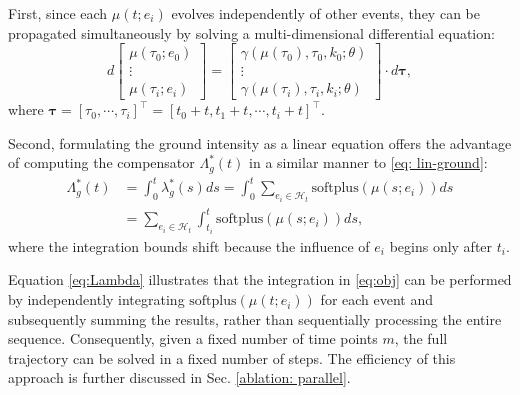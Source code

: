 First, since each $\mu(t; e_i)$ evolves independently of other events, they can be propagated simultaneously by solving a multi-dimensional differential equation:
\begin{equation}
    d 
    \begin{bmatrix}
        \mu(\tau_0 ;e_0) \\ \vdots \\ \mu(\tau_i;e_i)
    \end{bmatrix}
    = 
    \begin{bmatrix}
        \gamma(\mu(\tau_0), \tau_0, k_0;\theta) \\ \vdots \\ \gamma(\mu(\tau_i), \tau_i, k_i; \theta)
    \end{bmatrix}
    \cdot d \boldsymbol{\tau},
    \label{eq: train_parallel}
\end{equation}
where $ \boldsymbol{\tau} =[\tau_0, \cdots, \tau_i]^\top = [t_0 + t, t_1 + t, \cdots, t_i + t]^\top$. 

Second, formulating the ground intensity as a linear equation offers the advantage of computing the compensator $\Lambda^*_g(t)$ in a similar manner to \eqref{eq: lin-ground}:
\begin{align}
    \Lambda^*_g(t) & = \int_0^t \lambda_g^*(s) ds = \int_0^t \sum_{e_i \in \mathcal{H}_{t}} \text{softplus}(\mu(s; e_i)) ds \\    
    & = \sum_{e_i \in \mathcal{H}_{t}} \int_{t_i}^t \text{softplus}(\mu(s; e_i)) ds,
    \label{eq:Lambda}
\end{align}
where the integration bounds shift because the influence of $e_i$ begins only after $t_i$. 

Equation \eqref{eq:Lambda} illustrates that the integration in \eqref{eq:obj} can be performed by independently integrating $\text{softplus}(\mu(t; e_i))$ for each event and subsequently summing the results, rather than sequentially processing the entire sequence. Consequently, given a fixed number of time points $m$, the full trajectory can be solved in a fixed number of steps. The efficiency of this approach is further discussed in Sec. \ref{ablation: parallel}.

